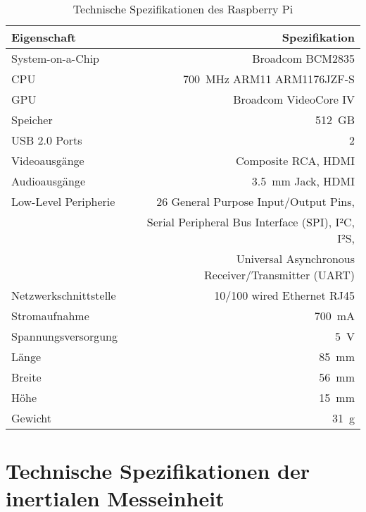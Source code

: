 \begin{table}[ht]
\begin{center}
\setlength{\tabcolsep}{18pt}
\begin{tabular}{lr}
\toprule
Eigenschaft & Spezifikation \\
\midrule
System-on-a-Chip & Broadcom BCM2835\\ \addlinespace
CPU & \SI{700}{\mega\Hz} ARM11 ARM1176JZF-S\\ \addlinespace
GPU & Broadcom VideoCore IV\\ \addlinespace
Speicher & \SI{512}{GB}\\ \addlinespace
USB 2.0 Ports & \SI{2}{}\\ \addlinespace
Videoausgänge & Composite RCA, HDMI\\ \addlinespace
Audioausgänge & \SI{3,5}{\milli\meter} Jack, HDMI\\ \addlinespace
Low-Level Peripherie & \SI{26}{} General Purpose Input/Output Pins,\\
& Serial Peripheral Bus Interface (SPI), I²C, I²S,\\
& Universal Asynchronous Receiver/Transmitter (UART)\\ \addlinespace
Netzwerkschnittstelle & \SI{10}{}/\SI{100}{} wired Ethernet RJ45\\ \addlinespace
Stromaufnahme & \SI{700}{\milli\ampere}\\ \addlinespace
Spannungsversorgung & \SI{5}{\volt}\\ \addlinespace
Länge & \SI{85}{\milli\meter}\\ \addlinespace
Breite & \SI{56}{\milli\meter}\\ \addlinespace
Höhe & \SI{15}{\milli\meter}\\ \addlinespace
Gewicht & \SI{31}{\gram}\\
\bottomrule
\end{tabular}
\caption{Technische Spezifikationen des Raspberry Pi\textsuperscript{\texttrademark}}
\end{center}
\label{tab:raspberry}
\end{table}

\clearpage{}

\section{Technische Spezifikationen der inertialen Messeinheit}
\label{app.imu}

